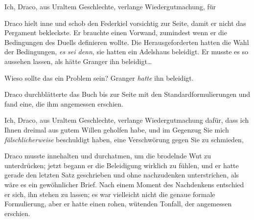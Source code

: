 \begin{writtenNote}
Ich, Draco, aus Uraltem Geschlechte, verlange Wiedergutmachung, für
\end{writtenNote}

Draco hielt inne und schob den Federkiel vorsichtig zur Seite, damit er nicht das Pergament bekleckste. Er brauchte einen Vorwand, zumindest wenn er die Bedingungen des Duells definieren wollte. Die Herausgeforderten hatten die Wahl der Bedingungen, \emph{es sei denn}, sie hatten ein Adelshaus beleidigt. Er musste es so aussehen lassen, als hätte Granger ihn beleidigt…

Wieso sollte das ein Problem sein? Granger \emph{hatte} ihn beleidigt.

Draco durchblätterte das Buch bis zur Seite mit den Standardformulierungen und fand eine, die ihm angemessen erschien.

\begin{writtenNote}
Ich, Draco, aus Uraltem Geschlechte, verlange Wiedergutmachung dafür, dass ich Ihnen dreimal aus gutem Willen geholfen habe, und im Gegenzug Sie mich \emph{fälschlicherweise} beschuldigt haben, eine Verschwörung gegen Sie zu schmieden,
\end{writtenNote}

Draco musste innehalten und durchatmen, um die brodelnde Wut zu unterdrücken; jetzt begann er die Beleidigung wirklich zu fühlen, und er hatte gerade den letzten Satz geschrieben und ohne nachzudenken unterstrichen, als wäre es ein gewöhnlicher Brief. Nach einem Moment des Nachdenkens entschied er sich, ihn stehen zu lassen; es war vielleicht nicht die genaue formale Formulierung, aber er hatte einen rohen, wütenden Tonfall, der angemessen erschien.


